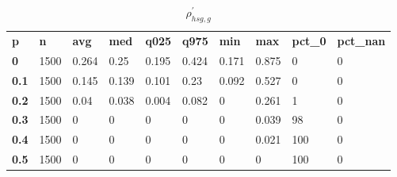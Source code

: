 \begin{table}[h]
 \centering 
\footnotesize
\caption{$\rho_{hsg,g}^\prime $}
\label{tab:alphahsgg}
\begin{tabular}[h]{| l l l l l l l l l l|
    } \hline
\textbf{ p} & \textbf{ n} & \textbf{ avg} & \textbf{ med} & \textbf{ q025} & \textbf{ q975} & \textbf{ min} & \textbf{ max} & \textbf{ pct\_0} & \textbf{ pct\_nan}
           \\
  \textbf{  0} & 1500 & 0.264 &  0.25 & 0.195 & 0.424 & 0.171 & 0.875 &   0 & 0
           \\
  \textbf{0.1} & 1500 & 0.145 & 0.139 & 0.101 &  0.23 & 0.092 & 0.527 &   0 & 0
           \\
  \textbf{0.2} & 1500 &  0.04 & 0.038 & 0.004 & 0.082 &     0 & 0.261 &   1 & 0
           \\
  \textbf{0.3} & 1500 &     0 &     0 &     0 &     0 &     0 & 0.039 &  98 & 0
           \\
  \textbf{0.4} & 1500 &     0 &     0 &     0 &     0 &     0 & 0.021 & 100 & 0
           \\
  \textbf{0.5} & 1500 &     0 &     0 &     0 &     0 &     0 &     0 & 100 & 0
           \\
 \hline \end{tabular}
 \end{table}
